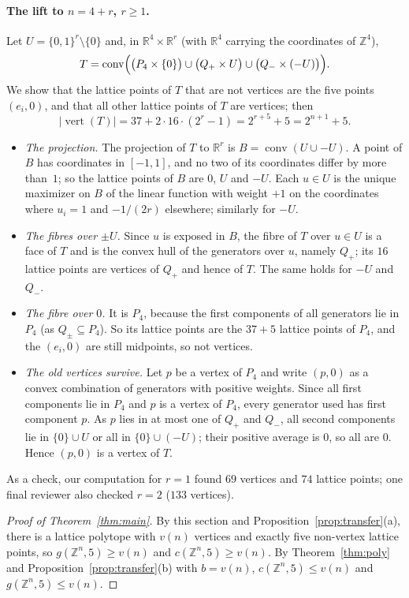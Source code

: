 \documentclass[11pt]{article}
\theoremstyle{definition}
\theoremstyle{remark}
\newcommand{\Z}{\mathbb Z}
\newcommand{\R}{\mathbb R}
\newcommand{\vertx}{\operatorname{vert}}
\newcommand{\conv}{\operatorname{conv}}
\begin{document}
\paragraph{The lift to $n=4+r$, $r\ge1$.} Let $U=\{0,1\}^r\setminus\{0\}$ and,
in $\R^4\times\R^r$ (with $\R^4$ carrying the coordinates of $\Z^4$),
\[
T=\conv\Bigl(\bigl(P_4\times\{0\}\bigr)\cup\bigl(Q_+\times U\bigr)\cup\bigl(Q_-\times(-U)\bigr)\Bigr).
\]
We show that the lattice points of $T$ that are not vertices are the five
points $(e_i,0)$, and that all other lattice points of $T$ are vertices; then
\[
|\vertx(T)|=37+2\cdot16\cdot(2^r-1)=2^{r+5}+5=2^{n+1}+5 .
\]
\begin{itemize}
\item \emph{The projection.} The projection of $T$ to $\R^r$ is
$B=\conv(U\cup-U)$. A point of $B$ has coordinates in $[-1,1]$, and no two of
its coordinates differ by more than~$1$; so the lattice points of $B$ are
$0$, $U$ and $-U$. Each $u\in U$ is the unique maximizer on $B$ of the linear
function with weight $+1$ on the coordinates where $u_i=1$ and $-1/(2r)$
elsewhere; similarly for $-U$.
\item \emph{The fibres over $\pm U$.} Since $u$ is exposed in $B$, the fibre of
$T$ over $u\in U$ is a face of $T$ and is the convex hull of the generators
over $u$, namely $Q_+$; its $16$ lattice points are vertices of $Q_+$ and hence
of $T$. The same holds
for $-U$ and $Q_-$.
\item \emph{The fibre over $0$.} It is $P_4$, because the first components of
all generators lie in $P_4$ (as $Q_\pm\subseteq P_4$). So its lattice points are
the $37+5$ lattice points of $P_4$, and the $(e_i,0)$ are still midpoints, so
not vertices.
\item \emph{The old vertices survive.} Let $p$ be a vertex of $P_4$ and write
$(p,0)$ as a convex combination of generators with positive weights. Since all
first components lie in $P_4$ and $p$ is a vertex of $P_4$, every generator used
has first component $p$. As $p$ lies in at most one of $Q_+$ and $Q_-$, all
second components lie in $\{0\}\cup U$ or all in $\{0\}\cup(-U)$; their positive
average is $0$, so all are $0$. Hence $(p,0)$ is a vertex of $T$.
\end{itemize}
As a check, our computation for $r=1$
found $69$ vertices and $74$ lattice points; one final reviewer also checked
$r=2$ ($133$ vertices).

\begin{proof}[Proof of Theorem~\ref{thm:main}]
By this section and Proposition~\ref{prop:transfer}(a), there is a
lattice polytope with $v(n)$ vertices and exactly five non-vertex lattice
points, so $g(\Z^n,5)\ge v(n)$ and $c(\Z^n,5)\ge v(n)$. By
Theorem~\ref{thm:poly} and Proposition~\ref{prop:transfer}(b) with $b=v(n)$,
$c(\Z^n,5)\le v(n)$ and $g(\Z^n,5)\le v(n)$.
\end{proof}
\end{document}
